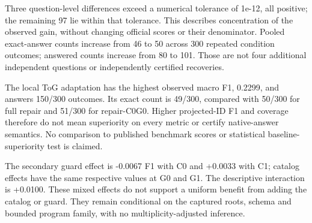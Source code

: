 \documentclass[10pt]{article}
\begin{document}
Three question-level differences exceed a numerical tolerance of 1e-12, all positive; the remaining 97 lie within that tolerance. This describes concentration of the observed gain, without changing official scores or their denominator. Pooled exact-answer counts increase from 46 to 50 across 300 repeated condition outcomes; answered counts increase from 80 to 101. Those are not four additional independent questions or independently certified recoveries.\par

The local ToG adaptation has the highest observed macro F1, 0.2299, and answers 150/300 outcomes. Its exact count is 49/300, compared with 50/300 for full repair and 51/300 for repair-C0G0. Higher projected-ID F1 and coverage therefore do not mean superiority on every metric or certify native-answer semantics. No comparison to published benchmark scores or statistical baseline-superiority test is claimed.\par

The secondary guard effect is -0.0067 F1 with C0 and +0.0033 with C1; catalog effects have the same respective values at G0 and G1. The descriptive interaction is +0.0100. These mixed effects do not support a uniform benefit from adding the catalog or guard. They remain conditional on the captured roots, schema and bounded program family, with no multiplicity-adjusted inference.\par

\begingroup\small\setlength{\tabcolsep}{4pt}
\end{document}
